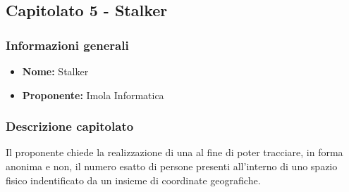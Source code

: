 \subsection{Capitolato 5 - Stalker}

	\subsubsection{Informazioni generali}
		\begin{itemize}
			\item \textbf{Nome:} Stalker
			\item \textbf{Proponente:} Imola Informatica
		\end{itemize}
	
	\subsubsection{Descrizione capitolato}
		Il proponente chiede la realizzazione di una  al fine di poter tracciare, in forma anonima e non, il numero esatto di persone presenti all'interno di uno spazio fisico indentificato da un insieme di coordinate geografiche.

